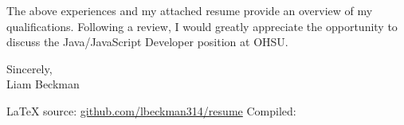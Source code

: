 \vspace*{\baselineskip}

The above experiences and my attached resume provide an overview of my qualifications. Following a review, I would greatly appreciate the opportunity to discuss the Java/JavaScript Developer position at OHSU.

\vspace*{2\baselineskip}

Sincerely,\\

Liam Beckman

\vfill \myBreak{}
\textcolor{my-red}{\LaTeX{} source:} \textcolor{my-blue}{\href{https://github.com/lbeckman314/resume}{github.com/lbeckman314/resume}}
\hfill
\textcolor{my-red}{Compiled:} \textcolor{my-blue}{\href{https://liambeckman.com/jenkins/job/resume/}{\DTMtoday}}

